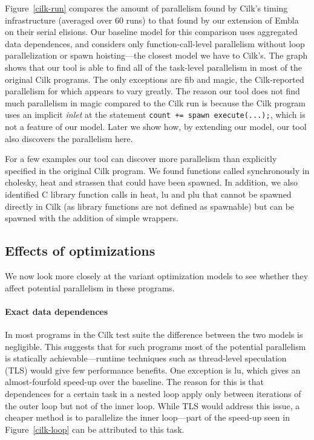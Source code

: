 Figure~\ref{cilk-run} compares the amount of parallelism found by Cilk's timing infrastructure (averaged over 60 runs) to that found by our extension of Embla on their serial elisions.
Our baseline model for this comparison uses aggregated data dependences, and considers only function-call-level parallelism without loop parallelization or spawn hoisting---the closest model we have to Cilk's.
The graph shows that our tool is able to find all of the task-level parallelism in most of the original Cilk programs.
The only exceptions are \textsf{fib} and \textsf{magic}, the Cilk-reported parallelism for which appears to vary greatly.
The reason our tool does not find much parallelism in \textsf{magic} compared to the Cilk run is because the Cilk program uses an implicit \emph{inlet} at the statement \texttt{count += spawn execute(...);},
which is not a feature of our model.
Later we show how, by extending our model, our tool also discovers the parallelism here.

For a few examples our tool can discover more parallelism than explicitly specified in the original Cilk program.
We found functions called synchronously in \textsf{cholesky}, \textsf{heat} and \textsf{strassen} that could have been spawned.
In addition, we also identified C library function calls in \textsf{heat},
\textsf{lu} and \textsf{plu} that cannot be spawned directly in Cilk (as library functions are not defined as spawnable) but can be spawned with the addition of simple wrappers.

\subsection{Effects of optimizations} \label{sresults:cilk-opts}

We now look more closely at the variant optimization models to see whether they affect potential parallelism in these programs.

\paragraph{Exact data dependences}
In most programs in the Cilk test suite the difference between the two models is negligible.
This suggests that for such programs most of the potential parallelism is statically achievable---runtime techniques such as thread-level speculation (TLS) would give few performance benefits.
One exception is \textsf{lu}, which gives an almost-fourfold speed-up over the baseline.
The reason for this is that dependences for a certain task in a nested loop apply only between iterations of the outer loop but not of the inner loop.
While TLS would address this issue, a cheaper method is to parallelize the inner loop---part of the speed-up seen in Figure~\ref{cilk-loop} can be attributed to this task.

